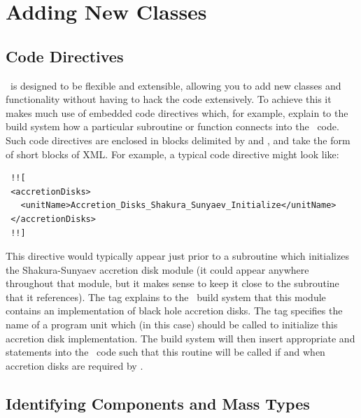 \chapter{Adding New Classes}

\section{Code Directives}\label{sec:CodeDirectives}

\glc\ is designed to be flexible and extensible, allowing you to add new classes and functionality without having to hack the code extensively. To achieve this it makes much use of embedded code directives which, for example, explain to the build system how a particular subroutine or function connects into the \glc\ code. Such code directives are enclosed in blocks delimited by \mono{!![} and \mono{!!]}, and take the form of short blocks of XML. For example, a typical code directive might look like:
\begin{verbatim}
 !![
 <accretionDisks>
   <unitName>Accretion_Disks_Shakura_Sunyaev_Initialize</unitName>
 </accretionDisks>
 !!]
\end{verbatim}
This directive would typically appear just prior to a subroutine which initializes the Shakura-Sunyaev accretion disk module (it could appear anywhere throughout that module, but it makes sense to keep it close to the subroutine that it references). The  tag explains to the \glc\ build system that this module contains an implementation of black hole accretion disks. The  tag specifies the name of a program unit which (in this case) should be called to initialize this accretion disk implementation. The build system will then insert appropriate  and  statements into the \glc\ code such that this routine will be called if and when accretion disks are required by \glc.

\section{Identifying Components and Mass Types}\label{sec:ComponentMassTypes}

